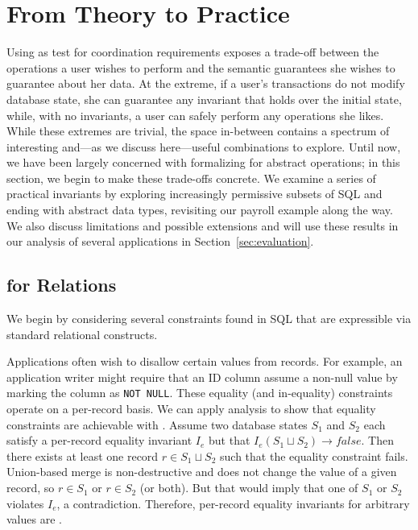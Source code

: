 
\section{From Theory to Practice}
\label{sec:bcc-practice}
\label{sec:merge}

Using \iconfluence as test for coordination requirements exposes a
trade-off between the operations a user wishes to perform and the
semantic guarantees she wishes to guarantee about her data. At the
extreme, if a user's transactions do not modify database state, she
can guarantee any invariant that holds over the initial state, while,
with no invariants, a user can safely perform any operations she
likes. While these extremes are trivial, the space in-between contains
a spectrum of interesting and---as we discuss here---useful
combinations to explore. Until now, we have been largely concerned
with formalizing \iconfluence for abstract operations; in this
section, we begin to make these trade-offs concrete. We examine a
series of practical invariants by exploring increasingly permissive
subsets of SQL and ending with abstract data types, revisiting our
payroll example along the way. We also discuss limitations and
possible extensions and will use these results in our analysis of
several applications in Section~\ref{sec:evaluation}.

\subsection{\iconfluence for Relations}

We begin by considering several constraints found in SQL that are
expressible via standard relational constructs.

 Applications often wish to disallow certain values
from records. For example, an application writer might require that an
ID column assume a non-null value by marking the column as \texttt{NOT
  NULL}. These equality (and in-equality) constraints operate on a
per-record basis. We can apply \iconfluence analysis to show that
equality constraints are achievable with \cfreedom. Assume two
database states $S_1$ and $S_2$ each satisfy a per-record equality
invariant $I_e$ but that $I_e(S_1 \sqcup S_2)\rightarrow false$. Then
there exists at least one record $r \in S_1 \sqcup S_2$ such that the
equality constraint fails. Union-based merge is non-destructive and
does not change the value of a given record, so $r \in S_1$ or $r \in
S_2$ (or both). But that would imply that one of $S_1$ or $S_2$
violates $I_e$, a contradiction. Therefore, per-record equality
invariants for arbitrary values are \iconfluent.

